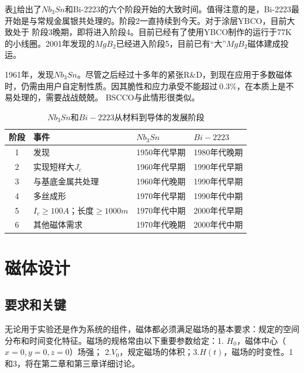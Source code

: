 表\ref{scstage}给出了$Nb_3Sn$和Bi-2223的六个阶段开始的大致时间。值得注意的是，Bi-2223最开始是与常规金属银共处理的。阶段2一直持续到今天。对于涂层YBCO，目前大致处于
阶段3晚期，即将进入阶段4。目前已经有了使用YBCO制作的运行于77K的小线圈。2001年发现的$MgB_2$已经进入阶段5，目前已有“大”$MgB_2$磁体建成投运。

1961年，发现$Nb_3Sn$。尽管之后经过十多年的紧张R\&D，到现在应用于多数磁体时，仍需由用户自定制性质。因其脆性和应力承受不能超过$~0.3\%$，在本质上是不易处理的，需要战战兢兢。
BSCCO与此情形很类似。
\begin{table}[htbp]\small
  \centering
  \caption{$Nb_3Sn$和$Bi-2223$从材料到导体的发展阶段} \label{scstage}
\begin{tabular}{|c||l|l|l|}
  \hline
  阶段&事件& $Nb_3Sn$ &$Bi-2223$ \\ \hline \hline
1 & 发现 & 1950年代早期& 1980年代晚期 \\ \hline
2 & 实现短样大$J_c$ & 1960年代早期 & 1990年代早期\\ \hline
3 &与基底金属共处理&1960年代晚期&1990年代早期\\ \hline
4 &多丝成形&1970年代早期&1990年代中期\\ \hline
5 &$I_c\ge 100A$；长度$\ge 1000m$ &1970年代中期&2000年代早期\\ \hline
6 &其他磁体需求&1970年代晚期&2000年代中期\\
  \hline
\end{tabular}
\end{table}


\section{磁体设计}
\subsection{要求和关键}
无论用于实验还是作为系统的组件，磁体都必须满足磁场的基本要求：规定的空间分布和时间变化特征。磁场的规格常由以下重要参数给定：1. $H_0$，磁体中心（$x=0, y=0, z=0$）场强；
2.$V_0$，规定磁场的体积；3.$H(t)$，磁场的时变性。1和3，将在第二章和第三章详细讨论。

